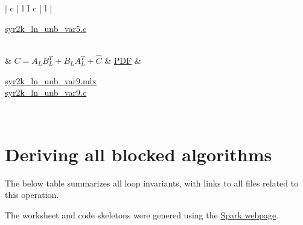 \begin{center}
\begin{tabular}{| c | l I c | l |}
\begin{minipage}{0.3\textwidth}
    	\href{syr2k_ln/FLAMEC/syr_2k_unb_var5.c}
    	{syr2k\_ln\_unb\_var5.c}
	    \end{minipage}
	    \\  & 
	    $
	    C = A_L B_L ^ T + B_L A_L ^ T + \widehat C
	    $
	    &
	    \href{syr2k_ln/Derivations/syr2k_ln_unb_var9.pdf}
	    {PDF}
	    &
	    \begin{minipage}{0.3\textwidth}
    	\href{syr2k_ln/flameatlab/syr_2k_unb_var9.mlx}
    	{syr2k\_ln\_unb\_var9.mlx}\\
    	\href{syr2k_ln/FLAMEC/syr_2k_unb_var9.c}
    	{syr2k\_ln\_unb\_var9.c}
	    \end{minipage}
	    \\ \hline
	\end{tabular}
\end{center}

\section{Deriving all blocked algorithms}

The below table summarizes all loop invariants, with links to all files related to this operation.

\noindent The worksheet and code skeletons were genered using 
the \href{http://edx-org-utaustinx.s3.amazonaws.com/UT1401x/LAFFPfC/Spark/index.html}{ Spark webpage}.


